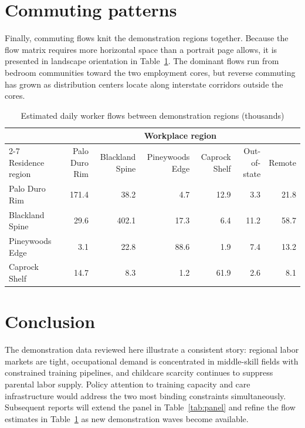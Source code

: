 \documentclass[11pt]{article}
\begin{document}
\section{Commuting patterns}\label{sec:commute}

Finally, commuting flows knit the demonstration regions together. Because the
flow matrix requires more horizontal space than a portrait page allows, it is
presented in landscape orientation in Table~\ref{tab:commute}. The dominant
flows run from bedroom communities toward the two employment cores, but
reverse commuting has grown as distribution centers locate along interstate
corridors outside the cores.

\begin{table}
\centering
\caption{Estimated daily worker flows between demonstration regions (thousands)}
\label{tab:commute}
\begin{tabular}{@{}lrrrrrr@{}}
\toprule
 & \multicolumn{6}{c}{Workplace region} \\
\cmidrule(l){2-7}
Residence region & Palo Duro Rim & Blackland Spine & Pineywoods Edge & Caprock Shelf & Out-of-state & Remote \\
\midrule
Palo Duro Rim   & 171.4 & 38.2  & 4.7   & 12.9 & 3.3  & 21.8 \\
Blackland Spine & 29.6  & 402.1 & 17.3  & 6.4  & 11.2 & 58.7 \\
Pineywoods Edge & 3.1   & 22.8  & 88.6  & 1.9  & 7.4  & 13.2 \\
Caprock Shelf   & 14.7  & 8.3   & 1.2   & 61.9 & 2.6  & 8.1  \\
\bottomrule
\end{tabular}
\end{table}

\section{Conclusion}

The demonstration data reviewed here illustrate a consistent story: regional
labor markets are tight, occupational demand is concentrated in middle-skill
fields with constrained training pipelines, and childcare scarcity continues
to suppress parental labor supply. Policy attention to training capacity and
care infrastructure would address the two most binding constraints
simultaneously. Subsequent reports will extend the panel in
Table~\ref{tab:panel} and refine the flow estimates in
Table~\ref{tab:commute} as new demonstration waves become available.
\end{document}
